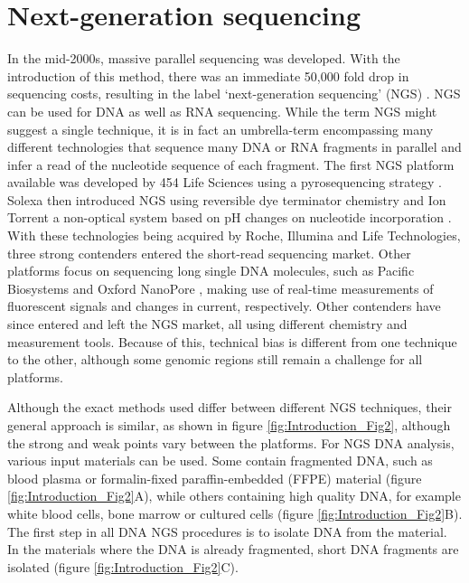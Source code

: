\section[Next-generation sequencing]{Next-generation sequencing}\label{intro_ngs}
In the mid-2000s, massive parallel sequencing was developed. With the introduction of this method, there was an immediate 50,000 fold drop in sequencing costs, resulting in the label ‘next-generation sequencing’ (NGS) \cite{Goodwin_2016}. 
NGS can be used for DNA as well as RNA sequencing. 
While the term NGS might suggest a single technique, it is in fact an umbrella-term encompassing many different technologies that sequence many DNA or RNA fragments in parallel and infer a read of the nucleotide sequence of each fragment.
The first NGS platform available was developed by 454 Life Sciences using a pyrosequencing strategy \cite{Margulies_2005}. 
Solexa then introduced NGS using reversible dye terminator chemistry \cite{Bentley_2008} and Ion Torrent a non-optical system based on pH changes on nucleotide incorporation \cite{Rothberg_2011}. 
With these technologies being acquired by Roche, Illumina and Life Technologies, three strong contenders entered the short-read sequencing market. Other platforms focus on sequencing long single DNA molecules, such as Pacific Biosystems \cite{Eid_2009} and Oxford NanoPore \cite{Clarke_2009}, making use of real-time measurements of fluorescent signals and changes in current, respectively. 
Other contenders have since entered and left the NGS market, all using different chemistry and measurement tools. Because of this, technical bias is different from one technique to the other, although some genomic regions still remain a challenge for all platforms. 

Although the exact methods used differ between different NGS techniques, their general approach is similar, as shown in figure \ref{fig:Introduction_Fig2}, although the strong and weak points vary between the platforms. 
For NGS DNA analysis, various input materials can be used. 
Some contain fragmented DNA, such as blood plasma or formalin-fixed paraffin-embedded (FFPE) material (figure \ref{fig:Introduction_Fig2}A), while others containing high quality DNA, for example white blood cells, bone marrow or cultured cells (figure \ref{fig:Introduction_Fig2}B). 
The first step in all DNA NGS procedures is to isolate DNA from the material. 
In the materials where the DNA is already fragmented, short DNA fragments are isolated (figure \ref{fig:Introduction_Fig2}C).

